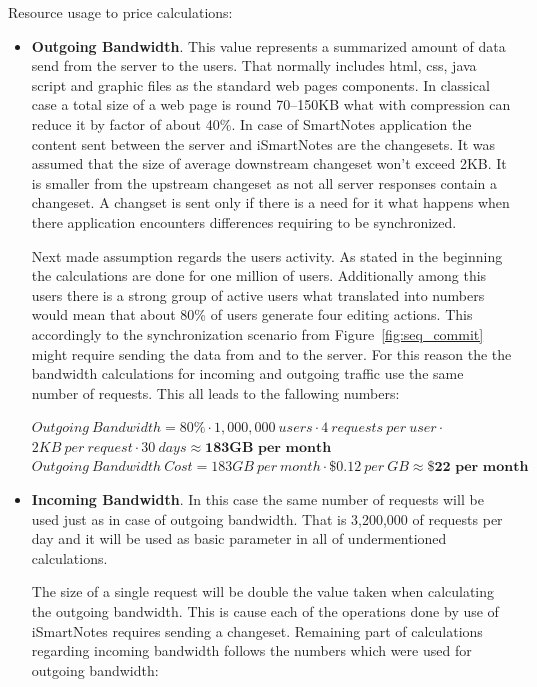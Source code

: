 Resource usage to price calculations:
\begin{itemize}
\item{\textbf{Outgoing Bandwidth}. This value represents a summarized amount of data send from the server to the users. That normally includes html, css, java script and graphic files as the standard web pages components. In classical case a total size of a web page is round \mbox{70--150KB} what with compression can reduce it by factor of about 40\%. In case of SmartNotes application the content sent between the server and iSmartNotes are the changesets. It was assumed that the size of average downstream changeset won't exceed 2KB. It is smaller from the upstream changeset as not all server responses contain a changeset. A changset is sent only if there is a need for it what happens when there application encounters differences requiring to be synchronized.   

Next made assumption regards the users activity. As stated in the beginning the calculations are done for one million of users. Additionally among this users there is a strong group of active users what translated into numbers would mean that about 80\% of users generate four editing actions. This accordingly to the synchronization scenario from Figure~\ref{fig:seq_commit} might require sending the data from and to the server.  For this reason the the bandwidth calculations for incoming and outgoing traffic use the same number of requests. This all leads to the fallowing numbers:

$Outgoing\ Bandwidth =  80\% \cdot 1,000,000\ users \cdot 4\ requests\ per\ user \cdot$\\ \hspace*{37mm} $2KB\ per\ request \cdot 30\ days \approx \textbf{183GB\ per\ month}$ \\ 
$Outgoing\ Bandwidth\ Cost = 183GB\ per\ month \cdot \$0.12\ per\ GB \approx \textbf{\$22 per\ month}$ }

\item{\textbf{Incoming Bandwidth}. In this case the same number of requests will be used just as in case of outgoing bandwidth. That is 3,200,000 of requests per day and it will be used as basic parameter in all of undermentioned calculations. 

The size of a single request will be double the value taken when calculating the outgoing bandwidth. This is cause each of the operations done by use of iSmartNotes requires sending a changeset. Remaining part of calculations regarding incoming bandwidth follows the numbers which were used for outgoing bandwidth:

}
\end{itemize}
